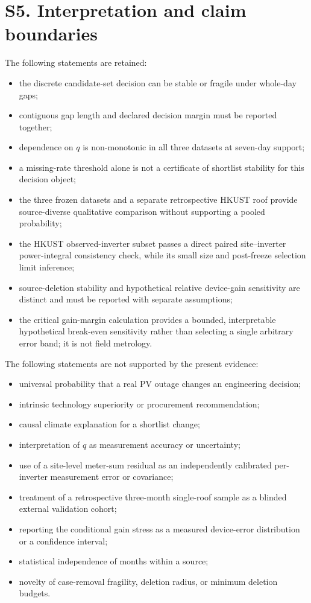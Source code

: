 \documentclass[11pt]{article}
\begin{document}
\section*{S5. Interpretation and claim boundaries}
The following statements are retained:
\begin{itemize}
    \item the discrete candidate-set decision can be stable or fragile under whole-day gaps;
    \item contiguous gap length and declared decision margin must be reported together;
    \item dependence on $q$ is non-monotonic in all three datasets at seven-day support;
    \item a missing-rate threshold alone is not a certificate of shortlist stability for this decision object;
    \item the three frozen datasets and a separate retrospective HKUST roof provide source-diverse qualitative comparison without supporting a pooled probability;
    \item the HKUST observed-inverter subset passes a direct paired site--inverter power-integral consistency check, while its small size and post-freeze selection limit inference;
    \item source-deletion stability and hypothetical relative device-gain sensitivity are distinct and must be reported with separate assumptions;
    \item the critical gain-margin calculation provides a bounded, interpretable hypothetical break-even sensitivity rather than selecting a single arbitrary error band; it is not field metrology.
\end{itemize}

The following statements are not supported by the present evidence:
\begin{itemize}
    \item universal probability that a real PV outage changes an engineering decision;
    \item intrinsic technology superiority or procurement recommendation;
    \item causal climate explanation for a shortlist change;
    \item interpretation of $q$ as measurement accuracy or uncertainty;
    \item use of a site-level meter-sum residual as an independently calibrated per-inverter measurement error or covariance;
    \item treatment of a retrospective three-month single-roof sample as a blinded external validation cohort;
    \item reporting the conditional gain stress as a measured device-error distribution or a confidence interval;
    \item statistical independence of months within a source;
    \item novelty of case-removal fragility, deletion radius, or minimum deletion budgets.
\end{itemize}
\end{document}
